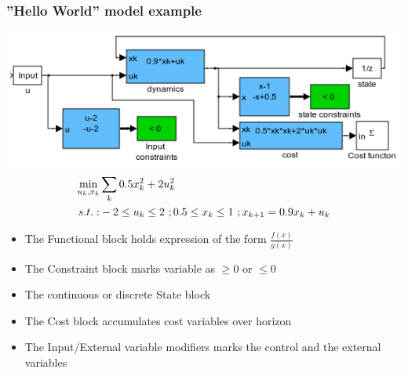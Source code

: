 \documentclass[mathserif]{beamer}
\begin{document}
\begin{frame}
\frametitle{''Hello World'' model example}

\centering 
\includegraphics[width = .7\textwidth]{HelloWorld}
\begin {align}
\min_{u_k,x_k}& \sum_k 0.5x_k^2 + 2u_k^2 \notag \\
s.t.:&  -2 \leq u_k \leq 2 \ ; 0.5 \leq x_k \leq 1\ ; x_{k+1}=0.9x_k+u_k \notag
\end{align}

\begin{itemize}
\item The \alert{Functional} block holds expression of the form $\frac{f(x)}{g(x)}$   
\item The \alert{Constraint} block marks variable as $\geq 0$ or $\leq 0$
\item The continuous or discrete \alert{State} block
\item The \alert{Cost} block accumulates cost variables over horizon
\item The \alert{Input/External} variable modifiers marks the control and the
  external variables
\end{itemize}
\end{frame}
\end{document}
